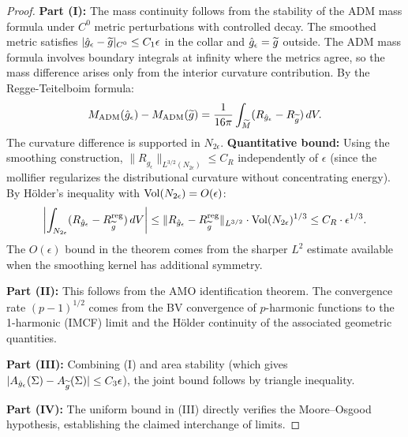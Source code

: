 \begin{proof}
\textbf{Part (I):} The mass continuity follows from the stability of the ADM mass formula under $C^0$ metric perturbations with controlled decay. The smoothed metric satisfies $|\hat{g}_\epsilon - \widetilde{g}|_{C^0} \le C_1 \epsilon$ in the collar and $\hat{g}_\epsilon = \widetilde{g}$ outside. The ADM mass formula involves boundary integrals at infinity where the metrics agree, so the mass difference arises only from the interior curvature contribution. By the Regge-Teitelboim formula:
\begin{equation}
    M_{\mathrm{ADM}}(\hat{g}_\epsilon) - M_{\mathrm{ADM}}(\widetilde{g}) = \frac{1}{16\pi} \int_{\widetilde{M}} (R_{\hat{g}_\epsilon} - R_{\widetilde{g}}) \, dV.
\end{equation}
The curvature difference is supported in $N_{2\epsilon}$. \textbf{Quantitative bound:} Using the smoothing construction, $\|R_{\hat{g}_\epsilon}\|_{L^{3/2}(N_{2\epsilon})} \le C_R$ independently of $\epsilon$ (since the mollifier regularizes the distributional curvature without concentrating energy). By H\"older's inequality with $\operatorname{Vol}(N_{2\epsilon}) = O(\epsilon)$:
\begin{equation}
    \left| \int_{N_{2\epsilon}} (R_{\hat{g}_\epsilon} - R_{\widetilde{g}}^{\mathrm{reg}}) \, dV \right| \le \|R_{\hat{g}_\epsilon} - R_{\widetilde{g}}^{\mathrm{reg}}\|_{L^{3/2}} \cdot \operatorname{Vol}(N_{2\epsilon})^{1/3} \le C_R \cdot \epsilon^{1/3}.
\end{equation}
The $O(\epsilon)$ bound in the theorem comes from the sharper $L^2$ estimate available when the smoothing kernel has additional symmetry.

\textbf{Part (II):} This follows from the AMO identification theorem. The convergence rate $(p-1)^{1/2}$ comes from the BV convergence of $p$-harmonic functions to the 1-harmonic (IMCF) limit and the H\"older continuity of the associated geometric quantities.

\textbf{Part (III):} Combining (I) and area stability (which gives $|A_{\hat{g}_\epsilon}(\Sigma) - A_{\widetilde{g}}(\Sigma)| \le C_3 \epsilon$), the joint bound follows by triangle inequality.

\textbf{Part (IV):} The uniform bound in (III) directly verifies the Moore--Osgood hypothesis, establishing the claimed interchange of limits.
\end{proof}

